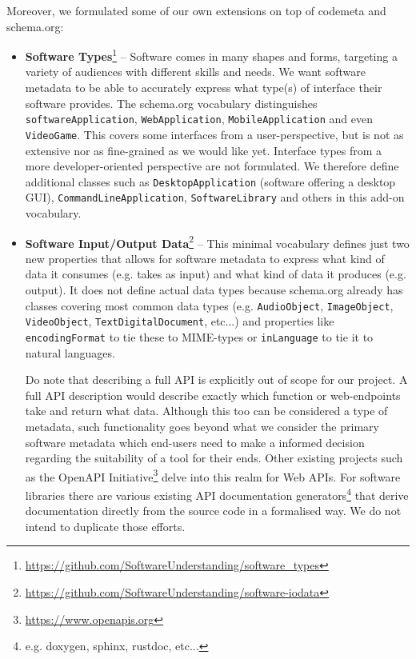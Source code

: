 \documentclass[a4paper,11pt]{article}
\begin{document}
Moreover, we formulated some of our own extensions on top of codemeta and
schema.org:

\begin{itemize}
\item \textbf{Software Types}\footnote{\url{https://github.com/SoftwareUnderstanding/software_types}}
-- Software comes in many shapes and forms, targeting a variety of
audiences with different skills and needs. We want
software metadata to be able to accurately express what type(s) of
interface their software provides. The schema.org vocabulary
distinguishes \texttt{softwareApplication}, \texttt{WebApplication},
\texttt{MobileApplication} and even \texttt{VideoGame}. This covers
some interfaces from a user-perspective, but is not as extensive nor as
fine-grained as we would like yet. Interface types from a more
developer-oriented perspective are not formulated. We therefore define
additional classes such as \texttt{DesktopApplication} (software
offering a desktop GUI), \texttt{CommandLineApplication},
\texttt{SoftwareLibrary} and others in this add-on vocabulary.
\item \textbf{Software Input/Output Data}\footnote{\url{https://github.com/SoftwareUnderstanding/software-iodata}}
-- This minimal vocabulary defines just two new properties that allows for software metadata to
express what kind of data it consumes (e.g. takes as input) and what
kind of data it produces (e.g. output). It does not define actual data types because schema.org already has 
classes covering most common data types (e.g. \texttt{AudioObject}, \texttt{ImageObject}, \texttt{VideoObject}, \texttt{TextDigitalDocument}, etc...) and properties
like \texttt{encodingFormat} to tie these to MIME-types or \texttt{inLanguage} to tie it to natural languages.

Do note that describing a full API is explicitly out of scope for our project.
A full API description would describe exactly which function or
web-endpoints take and return what data. Although this too can be
considered a type of metadata, such functionality goes beyond what we consider
the primary software metadata which end-users need to make a informed
decision regarding the suitability of a tool for their ends. Other
existing projects such as the OpenAPI
Initiative\footnote{\url{https://www.openapis.org}} delve into this realm 
for Web APIs. For software libraries there are 
various existing API documentation generators\footnote{e.g. doxygen, sphinx,
rustdoc, etc...} that derive documentation directly from the source
code in a formalised way. We do not intend to duplicate those efforts.
\end{itemize}
\end{document}
